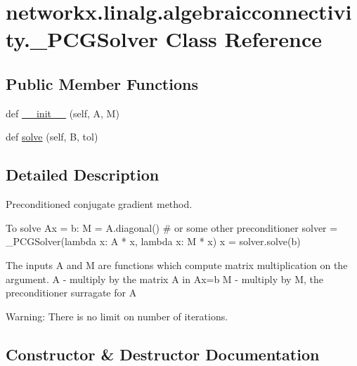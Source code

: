 \hypertarget{classnetworkx_1_1linalg_1_1algebraicconnectivity_1_1__PCGSolver}{}\section{networkx.\+linalg.\+algebraicconnectivity.\+\_\+\+P\+C\+G\+Solver Class Reference}
\label{classnetworkx_1_1linalg_1_1algebraicconnectivity_1_1__PCGSolver}
\subsection*{Public Member Functions}
\begin{DoxyCompactItemize}
\item 
def \hyperlink{classnetworkx_1_1linalg_1_1algebraicconnectivity_1_1__PCGSolver_ac0e0f9602526df9f45bf2995ae160cfc}{\+\_\+\+\_\+init\+\_\+\+\_\+} (self, A, M)
\item 
def \hyperlink{classnetworkx_1_1linalg_1_1algebraicconnectivity_1_1__PCGSolver_a82deb87df9ee62a11c434cd27dac07bf}{solve} (self, B, tol)
\end{DoxyCompactItemize}


\subsection{Detailed Description}
\begin{DoxyVerb}Preconditioned conjugate gradient method.

To solve Ax = b:
    M = A.diagonal() # or some other preconditioner
    solver = _PCGSolver(lambda x: A * x, lambda x: M * x)
    x = solver.solve(b)

The inputs A and M are functions which compute
matrix multiplication on the argument.
A - multiply by the matrix A in Ax=b
M - multiply by M, the preconditioner surragate for A

Warning: There is no limit on number of iterations.
\end{DoxyVerb}
 

\subsection{Constructor \& Destructor Documentation}
\mbox{\label{classnetworkx_1_1linalg_1_1algebraicconnectivity_1_1__PCGSolver_ac0e0f9602526df9f45bf2995ae160cfc}} 

